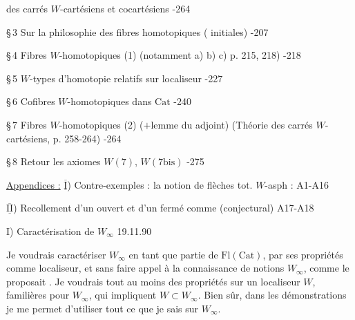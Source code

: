 

 des carrés $W$-cartésiens et cocartésiens -264

\S\,3 Sur la philosophie des fibres homotopiques ( initiales) -207

\S\,4 Fibres $W$-homotopiques (1) (notamment a) b) c) p. 215, 218) -218

\S\,5 $W$-types d'homotopie relatifs sur localiseur  -227

\S\,6 Cofibres $W$-homotopiques dans $\mathrm{Cat}$ -240

\S\,7 Fibres $W$-homotopiques (2) ($+$lemme du  adjoint) (Théorie des carrés $W$-cartésiens, p. 258-264) -264

\S\,8 Retour  les axiomes $W(7)$, $W(7\mathrm{bis})$ -275

\uline{Appendices :} $\overline{\underline{\mathrm{I}}}$) Contre-exemples  : la notion de flèches tot. $W$-asph : \hfill A1-A16


$\overline{\underline{\mathrm{II}}}$) Recollement d'un ouvert et d'un fermé comme    (conjectural) \hfill A17-A18


I) Caractérisation de $W_\infty$ \hfill 19.11.90

Je voudrais caractériser $W_\infty$ en tant que partie de $\mathrm{Fl}(\mathrm{Cat})$, par ses propriétés comme localiseur, et sans faire appel à la connaissance de notions   $W_\infty$, comme le proposait . Je voudrais tout au moins des propriétés sur un localiseur $W$, familières pour $W_\infty$, qui  impliquent $W\subset W_\infty$. Bien sûr, dans les démonstrations je me permet d'utiliser tout ce que je sais sur $W_\infty$.

